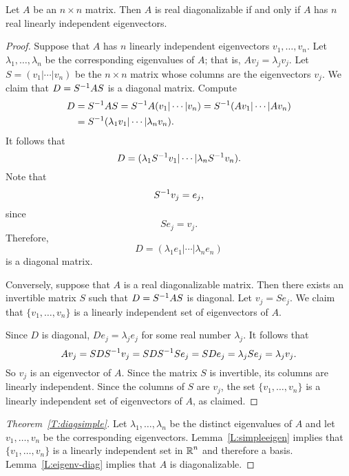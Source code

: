 \documentclass{ximera}
\begin{document}
\begin{lemma}  \label{L:eigenv-diag}
Let $A$ be an $n\times n$ matrix.  Then $A$ is real diagonalizable if
and only if $A$ has $n$ real linearly independent 
eigenvectors.
\end{lemma}  

\begin{proof}  Suppose that $A$ has $n$ linearly independent eigenvectors 
$v_1,\ldots,v_n$.  Let $\lambda_1,\ldots,\lambda_n$ be the 
corresponding eigenvalues of $A$; that is, $Av_j=\lambda_jv_j$.
Let $S=(v_1|\cdots|v_n)$ be the $n\times n$ matrix whose columns are the 
eigenvectors $v_j$.  We claim that $D=S^{-1} AS$ is a diagonal matrix.
Compute
\begin{align*}
  D&=S^{-1} AS=S^{-1} A(v_1|\cdots|v_n)=S^{-1}(Av_1|\cdots|Av_n)\\
  &=S^{-1}(\lambda_1v_1|\cdots|\lambda_nv_n).
\end{align*}
It follows that 
\[
D=(\lambda_1S^{-1} v_1|\cdots|\lambda_nS^{-1} v_n).
\]
Note that 
\[
S^{-1} v_j=e_j,
\]
since
\[
Se_j = v_j.
\]
Therefore,
\[
D= (\lambda_1e_1|\cdots|\lambda_ne_n)
\]
is a diagonal matrix.  

Conversely, suppose that $A$ is a real diagonalizable matrix.  Then there
exists an invertible matrix $S$ such that $D=S^{-1} AS$ is diagonal.  Let
$v_j = Se_j$.  We claim that $\{v_1,\ldots,v_n\}$ is a linearly independent 
set of eigenvectors of $A$.

Since $D$ is diagonal, $De_j=\lambda_je_j$ for some real number $\lambda_j$. 
It follows that
\[
Av_j = SDS^{-1} v_j = SDS^{-1} Se_j = SDe_j = \lambda_j Se_j = \lambda_jv_j.
\]  
So $v_j$ is an eigenvector of $A$.  Since the matrix $S$ is invertible, its
columns are linearly independent.  Since the columns of $S$ are $v_j$, the
set $\{v_1,\ldots,v_n\}$ is a linearly independent set of eigenvectors of
$A$, as claimed. \end{proof}



\begin{proof}[Theorem~\ref{T:diagsimple}] Let
$\lambda_1,\ldots,\lambda_n$ be the distinct eigenvalues of 
$A$ and let $v_1,\ldots,v_n$ be the corresponding eigenvectors.
Lemma~\ref{L:simpleeigen} implies that $\{v_1,\ldots,v_n\}$ is 
a linearly independent set in $\mbox{$\Bbb{R}$}^n$ and therefore a basis.
Lemma~\ref{L:eigenv-diag} implies that $A$ is diagonalizable.  \end{proof}
\end{document}
